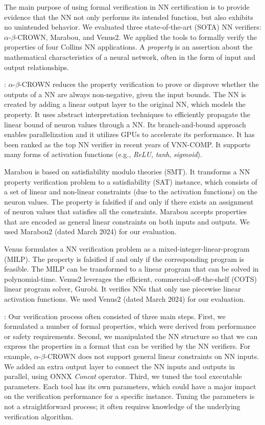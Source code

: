 The main purpose of using formal verification in NN certification is to provide evidence that the NN not only performs its intended function, but also exhibits no unintended behavior. 
We evaluated three state-of-the-art (SOTA) NN verifiers: $\alpha$-$\beta$-CROWN, Marabou, and Venus2. We applied the tools to formally verify the properties of four Collins NN applications. A \textit{property} is an assertion about the mathematical characteristics of a neural network, often in the form of input and output relationships.

: 
$\alpha$-$\beta$-CROWN \cite{abcrown} reduces the property verification to prove or disprove whether the outputs of a NN are always non-negative, given the input bounds. The NN is created by adding a linear output layer to the original NN, which models the property. It uses abstract interpretation techniques to efficiently propagate the linear bound of neuron values through a NN. Its branch-and-bound approach enables parallelization and it utilizes GPUs to accelerate its performance. It has been ranked as the top NN verifier in recent years of VNN-COMP. It supports many forms of activation functions (e.g., \textit{ReLU}, \textit{tanh}, \textit{sigmoid}).

Marabou \cite{marabou} \cite{marabou2} is based on satisfiability modulo theories (SMT). It transforms a NN property verification problem to a satisfiability (SAT) instance, which consists of a set of linear and non-linear constraints (due to the activation functions) on the neuron values. The property is falsified if and only if there exists an assignment of neuron values that satisfies all the constraints. Marabou accepts properties that are encoded as general linear constraints on both inputs and outputs. We used Marabou2 (dated March 2024) for our evaluation.

Venus \cite{venus} formulates a NN verification problem as a mixed-integer-linear-program (MILP). The property is falsified if and only if the corresponding program is feasible. The MILP can be transformed to a linear program that can be solved in polynomial-time. Venus2 leverages the efficient, commercial-off-the-shelf (COTS) linear program solver, Gurobi. It verifies NNs that only use piecewise linear activation functions. We used Venus2 (dated March 2024) for our evaluation.

: Our verification process often consisted of three main steps. First, we formulated a number of formal properties, which were derived from performance or safety requirements. Second, we manipulated the NN structure so that we can express the properties in a format that can be verified by the NN verifiers. For example, $\alpha$-$\beta$-CROWN does not support general linear constraints on NN inputs. We added an extra output layer to connect the NN inputs and outputs in parallel, using ONNX \emph{Concat} operator. Third, we tuned the tool executable parameters. Each tool has its own parameters, which could have a major impact on the verification performance for a specific instance. Tuning the parameters is not a straightforward process; it often requires knowledge of the underlying verification algorithm. 


